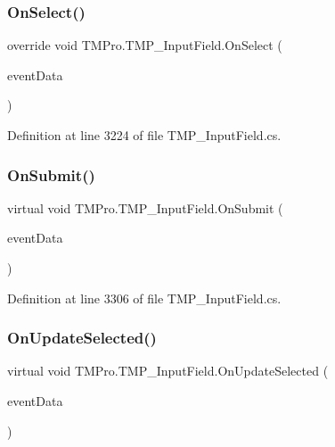 \subsubsection{\texorpdfstring{OnSelect()}{OnSelect()}}
{\footnotesize\ttfamily override void T\+M\+Pro.\+T\+M\+P\+\_\+\+Input\+Field.\+On\+Select (\begin{DoxyParamCaption}\item[{Base\+Event\+Data}]{event\+Data }\end{DoxyParamCaption})}



Definition at line 3224 of file T\+M\+P\+\_\+\+Input\+Field.\+cs.

\mbox{\label{class_t_m_pro_1_1_t_m_p___input_field_a5d0a7dce46ca21b97a7a1554579d2887}} 
\subsubsection{\texorpdfstring{OnSubmit()}{OnSubmit()}}
{\footnotesize\ttfamily virtual void T\+M\+Pro.\+T\+M\+P\+\_\+\+Input\+Field.\+On\+Submit (\begin{DoxyParamCaption}\item[{Base\+Event\+Data}]{event\+Data }\end{DoxyParamCaption})\hspace{0.3cm}{\ttfamily [virtual]}}



Definition at line 3306 of file T\+M\+P\+\_\+\+Input\+Field.\+cs.

\mbox{\label{class_t_m_pro_1_1_t_m_p___input_field_a6daaf6eadebb182f92aa088d7abb86dc}} 
\subsubsection{\texorpdfstring{OnUpdateSelected()}{OnUpdateSelected()}}
{\footnotesize\ttfamily virtual void T\+M\+Pro.\+T\+M\+P\+\_\+\+Input\+Field.\+On\+Update\+Selected (\begin{DoxyParamCaption}\item[{Base\+Event\+Data}]{event\+Data }\end{DoxyParamCaption})\hspace{0.3cm}{\ttfamily [virtual]}}






